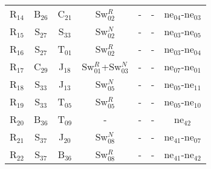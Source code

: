 \begin{table}[H]
{{\begin{tabular}{ c c c c c c c }
                    R$_{14}$  & B$_{26}$ & C$_{21}$ & Sw$_{02}^{R}$ & - & - & ne$_{04}$-ne$_{03}$\\
                    R$_{15}$  & S$_{27}$ & S$_{33}$ & Sw$_{02}^{N}$ & - & - & ne$_{03}$-ne$_{05}$\\
                    R$_{16}$  & S$_{27}$ & T$_{01}$ & Sw$_{02}^{R}$ & - & - & ne$_{03}$-ne$_{04}$\\
                    R$_{17}$  & C$_{29}$ & J$_{18}$ & Sw$_{01}^{R}$+Sw$_{03}^{N}$ & - & - & ne$_{07}$-ne$_{01}$\\
                    R$_{18}$  & S$_{33}$ & J$_{13}$ & Sw$_{05}^{N}$ & - & - & ne$_{05}$-ne$_{11}$\\
                    R$_{19}$  & S$_{33}$ & T$_{05}$ & Sw$_{05}^{R}$ & - & - & ne$_{05}$-ne$_{10}$\\
                    R$_{20}$  & B$_{36}$ & T$_{09}$ & - & - & - & ne$_{42}$\\
                    R$_{21}$  & S$_{37}$ & J$_{20}$ & Sw$_{08}^{N}$ & - & - & ne$_{41}$-ne$_{07}$\\
                    R$_{22}$  & S$_{37}$ & B$_{36}$ & Sw$_{08}^{R}$ & - & - & ne$_{41}$-ne$_{42}$\\
                \hline
            \end{tabular}
        }
     }
    \end{table}
    
    \lipsum[1]